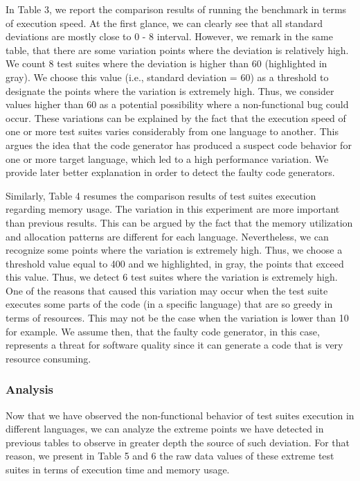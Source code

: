 In Table 3, we report the comparison results of running the benchmark in terms of execution speed. At the first glance, we can clearly see that all standard deviations are mostly close to 0 - 8 interval. However, we remark in the same table, that there are some variation points where the deviation is relatively high. We count 8 test suites where the deviation is higher than 60 (highlighted in gray). We choose this value (i.e., standard deviation = 60) as a threshold to designate the points where the variation is extremely high. Thus, we consider values higher than 60 as a potential possibility where a non-functional bug could occur. These variations can be explained by the fact that the execution speed of one or more test suites varies considerably from one language to another. This argues the idea that the code generator has produced a suspect code behavior for one or more target language, which led to a high performance variation. We provide later better explanation in order to detect the faulty code generators.

Similarly, Table 4 resumes the comparison results of test suites execution regarding memory usage. The variation in this experiment are more important than previous results. This can be argued by the fact that the memory utilization and allocation patterns are different for each language. Nevertheless, we can recognize some points where the variation is extremely high. Thus, we choose a threshold value equal to 400 and we highlighted, in gray, the points that exceed this value. Thus, we detect 6 test suites where the variation is extremely high. 
One of the reasons that caused this variation may occur when the test suite executes some parts of the code (in a specific language) that are so greedy in terms of resources. This may not be the case when the variation is lower than 10 for example.
We assume then, that the faulty code generator, in this case, represents a threat for software quality since it can generate a code that is very resource consuming.
 





\subsubsection{Analysis}
Now that we have observed the non-functional behavior of test suites execution in different languages, we can analyze the extreme points we have detected in previous tables to observe in greater depth the source of such deviation.
For that reason, we present in Table 5 and 6 the raw data values of these extreme test suites in terms of execution time and memory usage. 

